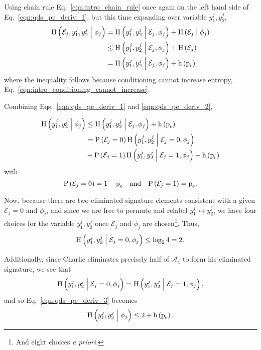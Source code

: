 \noindent Using chain rule Eq.~\ref{eqn:intro_chain_rule} once again on the left hand side of Eq.~\ref{eqn:qds_pe_deriv_1}, but this time expanding over variable $y_1^j, y_2^j$,
\begin{align}\label{eqn:qds_pe_deriv_2}
\text{H}\left( \mathcal{E}_j, y_1^j, y_2^j \; \middle| \; \phi_j \right) &=
\text{H}\left(y_1^j, y_2^j \; \middle| \; \mathcal{E}_j, \phi_j\right) + \text{H}\left(\mathcal{E}_j \; \middle| \; \phi_j\right) \notag \\
&\le \text{H}\left(y_1^j, y_2^j \; \middle| \; \mathcal{E}_j, \phi_j\right) + \text{H}\left(\mathcal{E}_j\right) \notag \\
&= \text{H}\left(y_1^j, y_2^j \; \middle| \; \mathcal{E}_j, \phi_j\right) + \text{h}\left(\text{p}_{\text{e}}\right)
\end{align}
where the inequality follows because conditioning cannot increase entropy, Eq.~\ref{eqn:intro_conditioning_cannot_increase}.

Combining Eqs.~\ref{eqn:qds_pe_deriv_1} and \ref{eqn:qds_pe_deriv_2},

\begin{align}\label{eqn:qds_pe_deriv_3}
\text{H}\left(y_1^j, y_2^j \; \middle| \; \phi_j\right) &\le \text{H}\left(y_1^j, y_2^j \; \middle| \; \mathcal{E}_j, \phi_j\right) + \text{h}\left(\text{p}_{\text{e}}\right) \notag \\
&= \text{P}\left(\mathcal{E}_j=0\right) \text{H}\left(y_1^j, y_2^j \; \middle| \; \mathcal{E}_j=0, \phi_j\right) \notag \\
&+ \text{P}\left(\mathcal{E}_j=1\right) \text{H}\left(y_1^j, y_2^j \; \middle| \; \mathcal{E}_j=1, \phi_j\right) + \text{h}\left(\text{p}_{\text{e}}\right)
\end{align}
with
\begin{equation}
\text{P}\left(\mathcal{E}_j=0\right) = 1 - \pe \qq{and} \text{P}\left(\mathcal{E}_j=1\right) = \pe.
\end{equation}

\noindent Now, because there are two eliminated signature elements consistent with a given $\mathcal{E}_j=0$ and $\phi_j$, and since we are free to permute and relabel $y_1^j \leftrightarrow y_2^j$, we have four choices for the variable $y_1^j, y_2^j$ once $\mathcal{E}_j$ and $\phi_j$ are chosen\footnote{And eight choices \emph{a priori}.}. Thus,
\begin{equation}
\text{H}\left(y_1^j, y_2^j \; \middle| \; \mathcal{E}_j=0, \phi_j\right) \le \log_2 4 = 2.
\end{equation}

\noindent Additionally, since Charlie eliminates precisely half of $\mathcal{A}_4$ to form his eliminated signature, we see that
\begin{equation}
\text{H}\left(y_1^j, y_2^j \; \middle| \; \mathcal{E}_j=0, \phi_j\right) = \text{H}\left(y_1^j, y_2^j \; \middle| \; \mathcal{E}_j=1, \phi_j\right),
\end{equation}
and so Eq.~\ref{eqn:qds_pe_deriv_3} becomes
\begin{equation}\label{eqn:qds_pe_deriv_4}
\text{H}\left(y_1^j, y_2^j \; \middle| \; \phi_j\right) \le 2 + \text{h}\left(\text{p}_{\text{e}}\right).
\end{equation}

